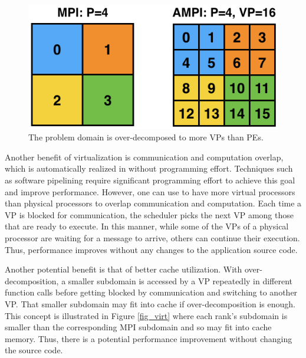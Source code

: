 \documentclass[10pt]{article}
\begin{document}
\begin{figure}[h]
\centering
\includegraphics[width=4.6in]{figs/prac.png}
\caption{The problem domain is over-decomposed to more VPs than PEs.}
\label{fig_prac}
\end{figure}

Another benefit of virtualization is communication and computation overlap, which
is automatically realized in \ampi{} without programming effort.
Techniques such as software pipelining require significant programming
effort to achieve this goal and improve performance. However, one can use \ampi{}
to have more virtual processors than physical processors to overlap communication
and computation. Each time a VP is blocked for communication, the \charmpp{}
scheduler picks the next VP among those that are ready to execute. In this
manner, while some of the VPs of a physical processor are waiting for a message
to arrive, others can continue their execution. Thus, performance improves
without any changes to the application source code.

Another potential benefit is that of better cache utilization. With
over-decomposition, a smaller subdomain is accessed by a VP repeatedly
in different function calls before getting blocked by communication and
switching to another VP. That smaller subdomain may fit into cache if
over-decomposition is enough. This concept is illustrated in Figure
\ref{fig_virt} where each \ampi{} rank's subdomain is smaller than the
corresponding MPI subdomain and so may fit into cache memory. Thus,
there is a potential performance improvement without changing the source code.
\end{document}
